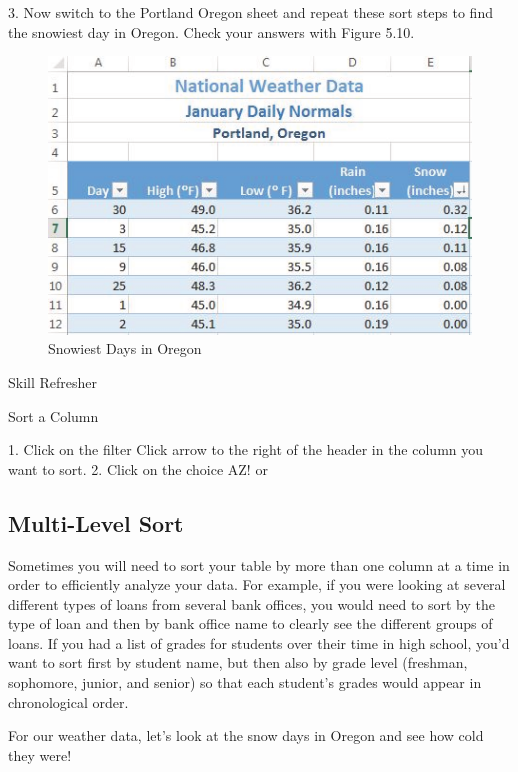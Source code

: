 3. Now switch to the Portland Oregon sheet and repeat these sort steps to find the snowiest day in
Oregon. Check your answers with Figure 5.10.

\begin{figure}[H]
	\centering
	\includegraphics[width=\maxwidth{.95\linewidth}]{gfx/ch05_fig10}
	\caption{Snowiest Days in Oregon}
	\label{05:fig10}
\end{figure}






Skill Refresher


Sort a Column

1. Click on the filter Click arrow to the right of the header in the column you want to sort.
2. Click on the choice AZ! or %




\subsection{Multi-Level Sort}

Sometimes you will need to sort your table by more than one column at a time in order to efficiently
analyze your data. For example, if you were looking at several different types of loans from several
bank offices, you would need to sort by the type of loan and then by bank office name to clearly see
the different groups of loans. If you had a list of grades for students over their time in high school,
you’d want to sort first by student name, but then also by grade level (freshman, sophomore, junior,
and senior) so that each student’s grades would appear in chronological order.

For our weather data, let’s look at the snow days in Oregon and see how cold they were!


